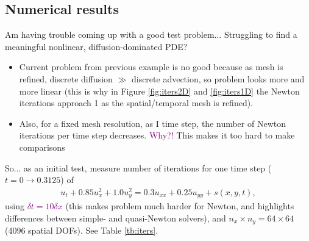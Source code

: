 \documentclass[review]{siamart}
\newcommand{\tcp}{\textcolor{purple}}
\begin{document}
\subsection{Numerical results}

Am having trouble coming up with a good test problem... Struggling to find a meaningful nonlinear, diffusion-dominated PDE?
\begin{itemize}
\setlength\itemsep{0.5em}

\item Current problem from previous example is no good because as mesh is refined, discrete diffusion $\gg$ discrete advection, so problem looks more and more linear (this is why in Figure \ref{fig:iters2D} and \ref{fig:iters1D} the Newton iterations approach 1 as the spatial/temporal mesh is refined). 

\item Also, for a fixed mesh resolution, as I time step, the number of Newton iterations per time step decreases. \tcp{Why?!} This makes it too hard to make comparisons

\end{itemize}

\vspace{1cm}
So... as an initial test, measure number of iterations for one time step ($t = 0 \to 0.3125$) of 
\begin{align}
u_t + 0.85 u^2_x + 1.0 u^2_y = 0.3 u_{xx} + 0.25 u_{yy}  + s(x,y,t),
\end{align}
using \tcp{$\delta t = 10 \delta x$} (this makes problem much harder for Newton, and highlights differences between simple- and quasi-Newton solvers), and $n_x \times n_y = 64 \times 64$ (4096 spatial DOFs). See Table \ref{tb:iters}.
\end{document}
